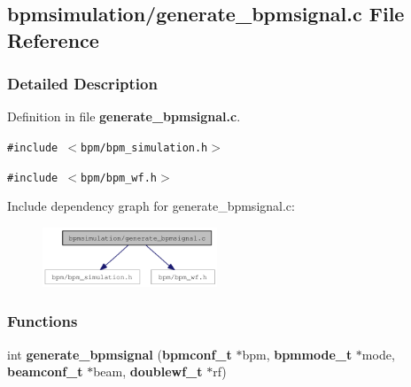 \subsection{bpmsimulation/generate\_\-bpmsignal.c File Reference}
\label{generate__bpmsignal_8c}


\subsubsection{Detailed Description}


Definition in file {\bf generate\_\-bpmsignal.c}.

{\tt \#include $<$bpm/bpm\_\-simulation.h$>$}\par
{\tt \#include $<$bpm/bpm\_\-wf.h$>$}\par


Include dependency graph for generate\_\-bpmsignal.c:\nopagebreak
\begin{figure}[H]
\begin{center}
\leavevmode
\includegraphics[width=148pt]{generate__bpmsignal_8c__incl}
\end{center}
\end{figure}
\subsubsection*{Functions}
\begin{CompactItemize}
\item 
int {\bf generate\_\-bpmsignal} ({\bf bpmconf\_\-t} $\ast$bpm, {\bf bpmmode\_\-t} $\ast$mode, {\bf beamconf\_\-t} $\ast$beam, {\bf doublewf\_\-t} $\ast$rf)
\end{CompactItemize}
